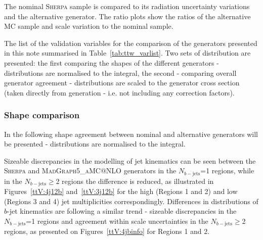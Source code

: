 The nominal  \textsc{Sherpa} \ttW  sample is compared to its radiation uncertainty variations and the alternative generator.
The ratio plots show the ratios of the alternative MC sample and scale variation to the nominal sample.

The list of the validation variables for the comparison of the \ttW generators presented in this note summarised in Table~\ref{tab:ttw_varlist}.
Two sets of distribution are presented: the first comparing the shapes of the different generators - distributions are normalised to the integral, the second - comparing overall generator agreement - distributions are scaled to the generator cross section (taken directly from generation - i.e. not including any correction factors).

\subsubsection{Shape comparison}
\label{sec:ttw_shape}
In the following shape agreement between nominal and alternative generators will be presented - distributions are normalised to the integral.

Sizeable discrepancies in the modelling of jet kinematics can be seen between the \textsc{Sherpa} \ttW and \textsc{MadGraph5\_aMC@NLO} generators in the $N_{b-\mathrm{jets}}$=1 regions, while in the $N_{b-\mathrm{jets}}\geq$2 regions the difference is reduced, as illustrated in Figures~\ref{ttV:4j12b} and~\ref{ttV:3j12b} for the high (Regions 1 and 2) and low (Regions 3 and 4) jet multiplicities correspondingly. 
Differences in distributions of $b$-jet kinematics are following a similar trend - sizeable discrepancies in the $N_{b-\mathrm{jets}}$=1 regions and agreement within scale uncertainties in the $N_{b-\mathrm{jets}}\geq$2 regions, as presented on Figures~\ref{ttV:4jbinfo} for Regions 1 and 2.


